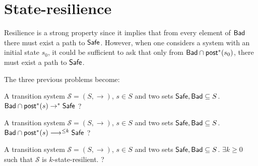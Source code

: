 



\section{State-resilience}


Resilience is a strong property since it implies that from every element of $\textsf{Bad}$ there must exist a path to $\textsf{Safe}$. However, when one considers a system with an initial state $s_0$, it could be sufficient to ask that only from $\textsf{Bad} \cap \textsf{post}^*(s_0)$, there must exist a path to $\textsf{Safe}$. 
%
%
%


The three previous problems become:


{A transition system $\mathscr{S}=(S,\rightarrow)$, $s \in S$ and two sets $\textsf{Safe}, \textsf{Bad} \subseteq S$.}
{$\textsf{Bad} \cap \textsf{post}^*(s)  \rightarrow^{*} \textsf{Safe} $ ? \newline}


{A transition system $\mathscr{S}=(S,\rightarrow)$, $s \in S$ and two sets $\textsf{Safe}, \textsf{Bad} \subseteq S$.}
{ $\textsf{Bad} \cap \textsf{post}^*(s) \longrightarrow^{\leq k} \textsf{Safe}$ ?  \newline}
%

{A transition system $\mathscr{S}=(S,\rightarrow)$, $s \in S$ and two sets $\textsf{Safe}, \textsf{Bad} \subseteq S$.}
{$\exists k \geq 0$ such that $\mathscr{S}$ is $k$-state-resilient. ?\newline}


